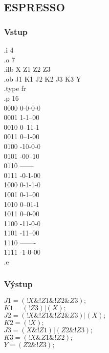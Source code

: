 \documentclass{article}
\begin{document}
\subsection{ESPRESSO}
\subsubsection{Vstup}
\begin{multicols}{2}
\noindent
.i 4\\
.o 7\\
.ilb X Z1 Z2 Z3\\
.ob J1 K1 J2 K2 J3 K3 Y\\
.type fr\\
.p 16\\
0000 0-0-0-0\\
0001 1-1--00\\
0010 0--11-1\\
0011 0--1-00\\
0100 -10-0-0\\
0101 -00--10\\
0110 ------\\
0111 -0-1-00\\
1000 0-1-1-0\\
1001 0-1--00\\
1010 0--01-1\\
1011 0--0-00\\
1100 -11-0-0\\
1101 -11--00\\
1110 -------\\
1111 -1-0-00\\
.e\\

\end{multicols}
\subsubsection{Výstup}
$J1 = (!X\&!Z1\&!Z2\&Z3);$\\
$K1 = (!Z3) | (X);$\\
$J2 = (!X\&!Z1\&!Z2\&Z3) | (X);$\\
$K2 = (!X);$\\
$J3 = (X\&!Z1) | (Z2\&!Z3);$\\
$K3 = (!X\&Z1\&!Z2);$\\
$Y = (Z2\&!Z3);$\\
\end{document}
